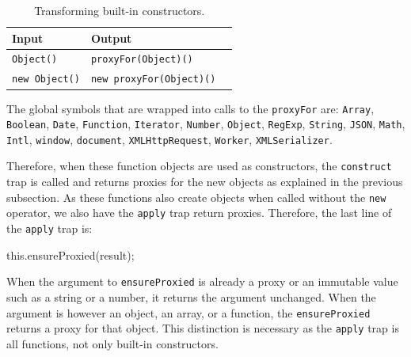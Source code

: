\begin{table}[h]
\begin{center}
\begin{tabular}{| l | l | l |}
\hline
Input & Output \\ \hline
\lstinline|Object()| & \lstinline|proxyFor(Object)()| \\ \hline
\lstinline|new Object()| & \lstinline|new proxyFor(Object)()| \\ \hline
\end{tabular}
\end{center}
\caption[Table caption text]{Transforming built-in constructors.}
\label{table:transformingBuiltInConstructors}
\end{table}

The global symbols that are wrapped into calls to the \lstinline{proxyFor} are: \lstinline{Array}, \lstinline{Boolean}, \lstinline{Date}, \lstinline{Function}, \lstinline{Iterator}, \lstinline{Number}, \lstinline{Object}, \lstinline{RegExp}, \lstinline{String}, \lstinline{JSON}, \lstinline{Math}, \lstinline{Intl}, \lstinline{window}, \lstinline{document}, \lstinline{XMLHttpRequest}, \lstinline{Worker}, \lstinline{XMLSerializer}.

Therefore, when these function objects are used as constructors, the \lstinline{construct} trap is called and returns proxies for the new objects as explained in the previous subsection.
As these functions also create objects when called without the \lstinline{new} operator, we also have the \lstinline{apply} trap return proxies.
Therefore, the last line of the \lstinline{apply} trap is:

\begin{code}{}{}
this.ensureProxied(result);
\end{code}
\iffalse
\end{verbatim}\fi

When the argument to \lstinline{ensureProxied} is already a proxy or an immutable value such as a string or a number, it returns the argument unchanged.
When the argument is however an object, an array, or a function, the \lstinline{ensureProxied} returns a proxy for that object.
This distinction is necessary as the \lstinline{apply} trap is all functions, not only built-in constructors.


